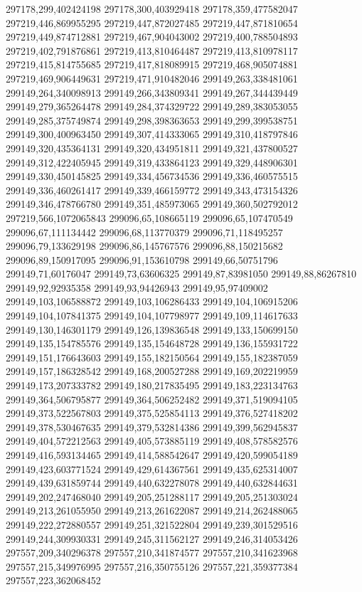 297178,299,402424198
297178,300,403929418
297178,359,477582047
297219,446,869955295
297219,447,872027485
297219,447,871810654
297219,449,874712881
297219,467,904043002
297219,400,788504893
297219,402,791876861
297219,413,810464487
297219,413,810978117
297219,415,814755685
297219,417,818089915
297219,468,905074881
297219,469,906449631
297219,471,910482046
299149,263,338481061
299149,264,340098913
299149,266,343809341
299149,267,344439449
299149,279,365264478
299149,284,374329722
299149,289,383053055
299149,285,375749874
299149,298,398363653
299149,299,399538751
299149,300,400963450
299149,307,414333065
299149,310,418797846
299149,320,435364131
299149,320,434951811
299149,321,437800527
299149,312,422405945
299149,319,433864123
299149,329,448906301
299149,330,450145825
299149,334,456734536
299149,336,460575515
299149,336,460261417
299149,339,466159772
299149,343,473154326
299149,346,478766780
299149,351,485973065
299149,360,502792012
297219,566,1072065843
299096,65,108665119
299096,65,107470549
299096,67,111134442
299096,68,113770379
299096,71,118495257
299096,79,133629198
299096,86,145767576
299096,88,150215682
299096,89,150917095
299096,91,153610798
299149,66,50751796
299149,71,60176047
299149,73,63606325
299149,87,83981050
299149,88,86267810
299149,92,92935358
299149,93,94426943
299149,95,97409002
299149,103,106588872
299149,103,106286433
299149,104,106915206
299149,104,107841375
299149,104,107798977
299149,109,114617633
299149,130,146301179
299149,126,139836548
299149,133,150699150
299149,135,154785576
299149,135,154648728
299149,136,155931722
299149,151,176643603
299149,155,182150564
299149,155,182387059
299149,157,186328542
299149,168,200527288
299149,169,202219959
299149,173,207333782
299149,180,217835495
299149,183,223134763
299149,364,506795877
299149,364,506252482
299149,371,519094105
299149,373,522567803
299149,375,525854113
299149,376,527418202
299149,378,530467635
299149,379,532814386
299149,399,562945837
299149,404,572212563
299149,405,573885119
299149,408,578582576
299149,416,593134465
299149,414,588542647
299149,420,599054189
299149,423,603771524
299149,429,614367561
299149,435,625314007
299149,439,631859744
299149,440,632278078
299149,440,632844631
299149,202,247468040
299149,205,251288117
299149,205,251303024
299149,213,261055950
299149,213,261622087
299149,214,262488065
299149,222,272880557
299149,251,321522804
299149,239,301529516
299149,244,309930331
299149,245,311562127
299149,246,314053426
297557,209,340296378
297557,210,341874577
297557,210,341623968
297557,215,349976995
297557,216,350755126
297557,221,359377384
297557,223,362068452
